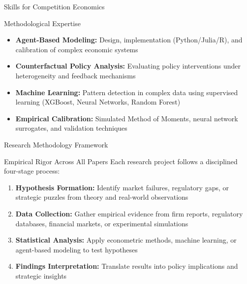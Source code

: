 \documentclass[10pt,aspectratio=169]{beamer}
\begin{document}
\begin{frame}{Skills for Competition Economics}
  \begin{alertblock}{Methodological Expertise}
    \begin{itemize}
      \item \textbf{Agent-Based Modeling:} Design, implementation (Python/Julia/R), and calibration of complex economic systems
      \item \textbf{Counterfactual Policy Analysis:} Evaluating policy interventions under heterogeneity and feedback mechanisms
      \item \textbf{Machine Learning:} Pattern detection in complex data using supervised learning (XGBoost, Neural Networks, Random Forest)
      \item \textbf{Empirical Calibration:} Simulated Method of Moments, neural network surrogates, and validation techniques
    \end{itemize}
  \end{alertblock}
\end{frame}


\begin{frame}{Research Methodology Framework}
  \begin{block}{Empirical Rigor Across All Papers}
    Each research project follows a disciplined four-stage process:
    \begin{enumerate}
      \item \textbf{Hypothesis Formation:} Identify market failures, regulatory gaps, or strategic puzzles from theory and real-world observations
      \item \textbf{Data Collection:} Gather empirical evidence from firm reports, regulatory databases, financial markets, or experimental simulations
      \item \textbf{Statistical Analysis:} Apply econometric methods, machine learning, or agent-based modeling to test hypotheses
      \item \textbf{Findings Interpretation:} Translate results into policy implications and strategic insights
    \end{enumerate}
  \end{block}
\end{frame}
\end{document}
